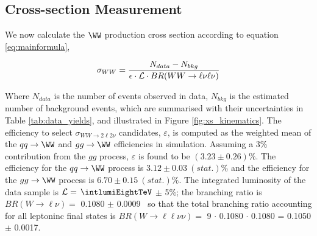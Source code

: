 \subsection{Cross-section Measurement}

We now calculate the $\WW$ production cross section according to equation \ref{eq:mainformula},

\begin{equation}
\label{eq:mainformula}
\sigma_{WW}  = \frac{N_{data} - N_{bkg}}{\epsilon \cdot {\cal{L}} \cdot BR(WW \to \ell \nu \ell \nu)}
\end{equation}

Where $N_{data}$ is the number of events observed in data, $N_{bkg}$ is the estimated number
of background events, which are summarised with their uncertainties in Table \ref{tab:data_yields},
and illustrated in Figure \ref{fig:xs_kinematics}.
The efficiency to select $\sigma_{WW \to 2\ell 2\nu}$ 
candidates, $\varepsilon$, is computed as the weighted mean of
the $qq\to\WW$ and $gg\to\WW$ efficiencies in simulation.
Assuming a 3\% contribution from the $gg$ process, 
$\varepsilon$ is found to be $(3.23 \pm 0.26)\%$. The efficiency 
for the $qq \to \WW$ process is $3.12 \pm 0.03~(stat.)\%$ and the 
efficiency for the $gg \to \WW$ process is $6.70 \pm 0.15~(stat.)\%$. 
The integrated luminosity of the data sample is ${\cal{L}} = $ $\intlumiEightTeV$ $\pm$ 5\%;
the branching ratio is $BR(W \to \ell \nu) =$ 0.1080 $\pm$ 0.0009~\cite{pdg} so that the total branching ratio
accounting for all leptoninc final states is $BR(W \to \ell \ell \nu \nu) =$ 9 $\cdot$ 0.1080 $\cdot$ 0.1080 = 0.1050 $\pm$ 0.0017.

